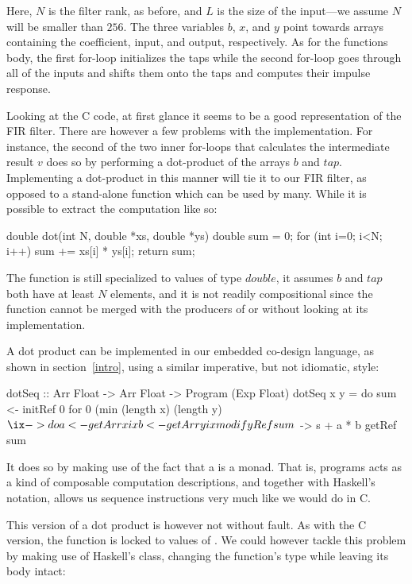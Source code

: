 \documentclass[../main.tex]{subfiles}
\begin{document}
\noindent Here, $N$ is the filter rank, as before, and $L$ is the size of the input---we assume $N$ will be smaller than $256$. The three variables $b$, $x$, and $y$ point towards arrays containing the coefficient, input, and output, respectively. As for the functions body, the first for-loop initializes the taps while the second for-loop goes through all of the inputs and shifts them onto the taps and computes their impulse response.

Looking at the C code, at first glance it seems to be a good representation of the FIR filter. There are however a few problems with the implementation. For instance, the second of the two inner for-loops that calculates the intermediate result $v$ does so by performing a dot-product of the arrays $b$ and $tap$. Implementing a dot-product in this manner will tie it to our FIR filter, as opposed to a stand-alone function which can be used by many. While it is possible to extract the computation like so:

\begin{code}
double dot(int N, double *xs, double *ys)
{
  double sum = 0;
  for (int i=0; i<N; i++) sum += xs[i] * ys[i];
  return sum;
}
\end{code}

\noindent The function is still specialized to values of type $double$, it assumes $b$ and $tap$ both have at least $N$ elements, and it is not readily compositional since the function cannot be merged with the producers of  or  without looking at its implementation.

A dot product can be implemented in our embedded co-design language, as shown in section~\ref{intro}, using a similar imperative, but not idiomatic, style:

\begin{code}
dotSeq :: Arr Float -> Arr Float -> Program (Exp Float)
dotSeq x y = do
  sum <- initRef 0
  for 0 (min (length x) (length y) $ \ix -> do
    a <- getArr x ix
    b <- getArr y ix
    modifyRef sum $ \s -> s + a * b
  getRef sum
\end{code}

\noindent It does so by making use of the fact that a  is a monad. That is, programs acts as a kind of composable computation descriptions, and together with Haskell's  notation, allows us sequence instructions very much like we would do in C.

This version of a dot product is however not without fault. As with the C version, the function is locked to values of . We could however tackle this problem by making use of Haskell's  class, changing the function's type while leaving its body intact:
\end{document}
